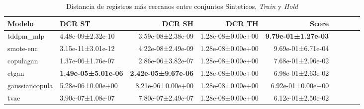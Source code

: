 \begin{table}[H]
\centering
\fontsize{10}{14}\selectfont
\caption{Distancia de registros más cercanos entre conjuntos Sinteticos, \emph{Train} y \emph{Hold}}
\label{table-dcr-economicos-a}
\begin{tabular}{|l|l|r|r|r|r|r|r|r|}
\hline
\rowcolor[gray]{0.8}
Modelo & DCR ST & DCR SH & DCR TH & \textbf{Score} \\
\hline tddpm\_mlp & 4.48e-09±2.32e-10 & \cellcolor[rgb]{0.9, 0.54, 0.52} 3.59e-08±2.38e-09 & 1.28e-08±0.00e+00 & \bfseries 9.79e-01±1.27e-03 \\
\hline smote-enc & \cellcolor[rgb]{0.9, 0.54, 0.52} 3.15e-11±3.01e-12 & 4.22e-08±2.49e-09 & 1.28e-08±0.00e+00 & 9.69e-01±6.71e-04 \\
\hline copulagan & 1.37e-06±1.76e-07 & 2.86e-06±3.82e-07 & 1.28e-08±0.00e+00 & 7.68e-01±2.96e-02 \\
\hline ctgan & \bfseries 1.49e-05±5.01e-06 & \bfseries 2.42e-05±9.67e-06 & 1.28e-08±0.00e+00 & 6.98e-01±2.63e-02 \\
\hline gaussiancopula & 5.28e-06±0.00e+00 & 8.21e-06±0.00e+00 & 1.28e-08±0.00e+00 & 6.92e-01±0.00e+00 \\
\hline tvae & 3.90e-07±1.08e-07 & 7.80e-07±2.49e-07 & 1.28e-08±0.00e+00 & \cellcolor[rgb]{0.9, 0.54, 0.52} 6.12e-01±2.50e-02 \\
\hline
\end{tabular}
\end{table}
